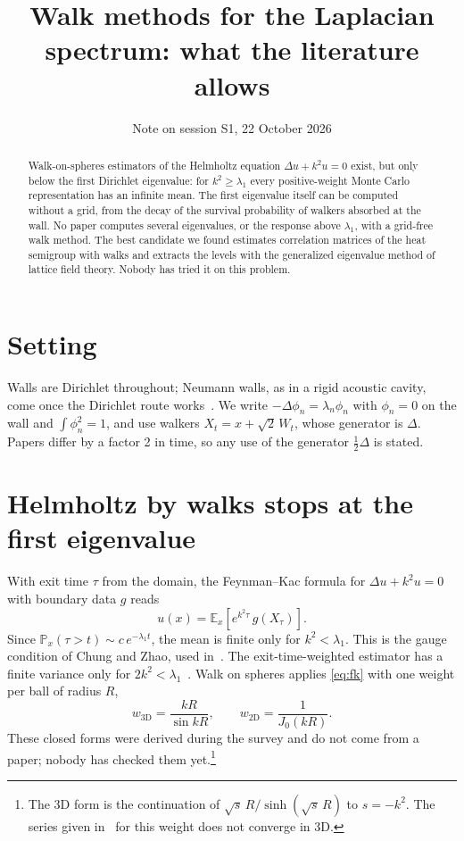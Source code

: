 \documentclass{article}
\title{Walk methods for the Laplacian spectrum: what the literature allows}
\author{Note on session S1, 22 October 2026}
\begin{document}
\maketitle

\begin{abstract}
Walk-on-spheres estimators of the Helmholtz equation $\Delta u+k^2u=0$ exist, but only below the first Dirichlet eigenvalue: for $k^2\ge\lambda_1$ every positive-weight Monte Carlo representation has an infinite mean. The first eigenvalue itself can be computed without a grid, from the decay of the survival probability of walkers absorbed at the wall. No paper computes several eigenvalues, or the response above $\lambda_1$, with a grid-free walk method. The best candidate we found estimates correlation matrices of the heat semigroup with walks and extracts the levels with the generalized eigenvalue method of lattice field theory. Nobody has tried it on this problem.
\end{abstract}

\section*{Setting}
Walls are Dirichlet throughout; Neumann walls, as in a rigid acoustic cavity, come once the Dirichlet route works~\cite{sawhney2023}. We write $-\Delta\phi_n=\lambda_n\phi_n$ with $\phi_n=0$ on the wall and $\int\phi_n^2=1$, and use walkers $X_t=x+\sqrt2\,W_t$, whose generator is $\Delta$. Papers differ by a factor 2 in time, so any use of the generator $\tfrac12\Delta$ is stated.

\section{Helmholtz by walks stops at the first eigenvalue}
\label{sec:barrier}
With exit time $\tau$ from the domain, the Feynman--Kac formula for $\Delta u+k^2u=0$ with boundary data $g$ reads
\begin{equation}
u(x)=\mathbb E_x\!\left[e^{k^2\tau}\,g(X_\tau)\right].
\label{eq:fk}
\end{equation}
Since $\mathbb P_x(\tau>t)\sim c\,e^{-\lambda_1 t}$, the mean is finite only for $k^2<\lambda_1$. This is the gauge condition of Chung and Zhao, used in~\cite{yang2015,rasila2026}. The exit-time-weighted estimator has a finite variance only for $2k^2<\lambda_1$~\cite{rasila2026}. Walk on spheres applies \eqref{eq:fk} with one weight per ball of radius $R$,
\begin{equation}
w_{3\mathrm D}=\frac{kR}{\sin kR},\qquad w_{2\mathrm D}=\frac{1}{J_0(kR)}.
\label{eq:weights}
\end{equation}
These closed forms were derived during the survey and do not come from a paper; nobody has checked them yet.\footnote{The 3D form is the continuation of $\sqrt{s}\,R/\sinh(\sqrt{s}\,R)$ to $s=-k^2$. The series given in~\cite{yang2015} for this weight does not converge in 3D.}
\end{document}
